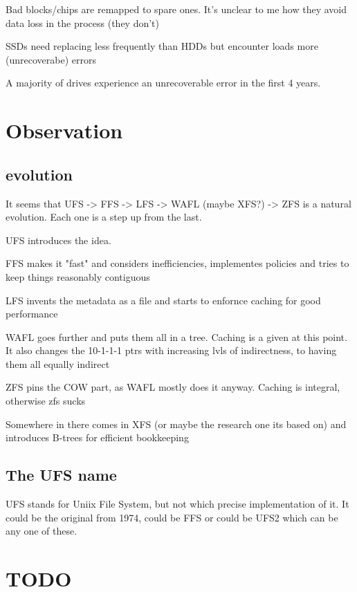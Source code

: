 \documentclass[a4paper]{report}
\begin{document}
        Bad blocks/chips are remapped to spare ones. It's unclear to me how
        they avoid data loss in the process (they don't)

        SSDs need replacing less frequently than HDDs but encounter loads more
        (unrecoverabe) errors

        A majority of drives experience an unrecoverable error in the first 4
        years.

\section{Observation}
    \subsection{evolution}

        It seems that UFS -> FFS -> LFS -> WAFL (maybe XFS?) -> ZFS is a
        natural evolution. Each one is a step up from the last.

        UFS introduces the idea.

        FFS makes it "fast" and considers inefficiencies, implementes policies
        and tries to keep things reasonably contiguous

        LFS invents the metadata as a file and starts to enfornce caching for
        good performance

        WAFL goes further and puts them all in a tree. Caching is a given at
        this point. It also changes the 10-1-1-1 ptrs with increasing lvls of
        indirectness, to having them all equally indirect

        ZFS pins the COW part, as WAFL mostly does it anyway. Caching is
        integral, otherwise zfs sucks

        Somewhere in there comes in XFS (or maybe the research one its based
        on) and introduces B-trees for efficient bookkeeping

    \subsection{The UFS name}

        UFS stands for Uniix File System, but not which precise implementation
        of it. It could be the original from 1974, could be FFS or could be
        UFS2 which can be any one of these.


\section{TODO}
\end{document}
